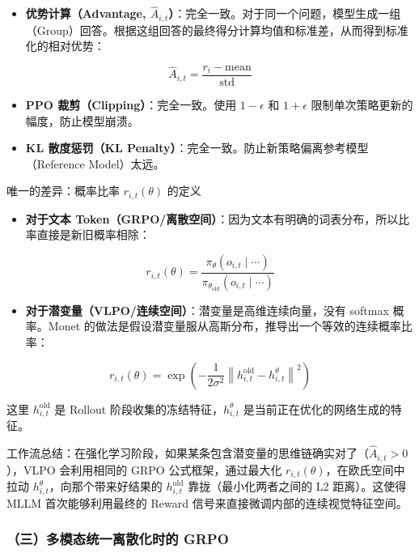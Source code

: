 \begin{itemize}
\tightlist
\item
  \textbf{优势计算（Advantage, \(\hat A_{i,t}\)）}：完全一致。对于同一个问题，模型生成一组（Group）回答。根据这组回答的最终得分计算均值和标准差，从而得到标准化的相对优势：
\end{itemize}

\[
\hat A_{i,t}=\frac{r_i-\mathrm{mean}}{\mathrm{std}}
\]

\begin{itemize}
\tightlist
\item
  \textbf{PPO 裁剪（Clipping）}：完全一致。使用 \(1-\epsilon\) 和 \(1+\epsilon\) 限制单次策略更新的幅度，防止模型崩溃。
\item
  \textbf{KL 散度惩罚（KL Penalty）}：完全一致。防止新策略偏离参考模型（Reference Model）太远。
\end{itemize}

唯一的差异：概率比率 \(r_{i,t}(\theta)\) 的定义

\begin{itemize}
\tightlist
\item
  \textbf{对于文本 Token（GRPO/离散空间）}：因为文本有明确的词表分布，所以比率直接是新旧概率相除：
\end{itemize}

\[
r_{i,t}(\theta)=
\frac{\pi_{\theta}(o_{i,t}\mid\cdots)}
{\pi_{\theta_{\mathrm{old}}}(o_{i,t}\mid\cdots)}
\]

\begin{itemize}
\tightlist
\item
  \textbf{对于潜变量（VLPO/连续空间）}：潜变量是高维连续向量，没有 softmax 概率。Monet 的做法是假设潜变量服从高斯分布，推导出一个等效的连续概率比率：
\end{itemize}

\[
r_{i,t}(\theta)=
\exp\left(
-\frac{1}{2\sigma^2}
\left\lVert h_{i,t}^{\mathrm{old}}-h_{i,t}^{\theta}\right\rVert^2
\right)
\]

这里 \(h_{i,t}^{\mathrm{old}}\) 是 Rollout 阶段收集的冻结特征，\(h_{i,t}^{\theta}\) 是当前正在优化的网络生成的特征。

工作流总结：在强化学习阶段，如果某条包含潜变量的思维链确实对了（\(\hat A_{i,t}>0\)），VLPO 会利用相同的 GRPO 公式框架，通过最大化 \(r_{i,t}(\theta)\)，在欧氏空间中拉动 \(h_{i,t}^{\theta}\)，向那个带来好结果的 \(h_{i,t}^{\mathrm{old}}\) 靠拢（最小化两者之间的 L2 距离）。这使得 MLLM 首次能够利用最终的 Reward 信号来直接微调内部的连续视觉特征空间。

\hypertarget{ux4e09ux591aux6a21ux6001ux7edfux4e00ux79bbux6563ux5316ux65f6ux7684-grpo}{%
\subsubsection{（三）多模态统一离散化时的 GRPO}\label{ux4e09ux591aux6a21ux6001ux7edfux4e00ux79bbux6563ux5316ux65f6ux7684-grpo}}

